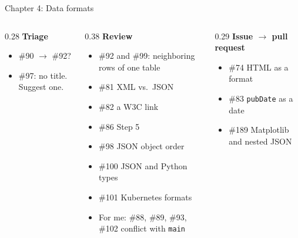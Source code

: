 \documentclass[9pt,aspectratio=169]{beamer}
\begin{document}
\begin{frame}{Chapter 4: Data formats}
    \begin{columns}[T]
        \begin{column}{0.28\textwidth}
            \textbf{Triage}
            \begin{itemize}\small
                \item \#90 $\to$ \#92?
                \item \#97: no title. Suggest one.
            \end{itemize}
        \end{column}
        \begin{column}{0.38\textwidth}
            \textbf{Review}
            \begin{itemize}\small
                \item \#92 and \#99: neighboring rows of one table
                \item \#81 XML vs.\ JSON
                \item \#82 a W3C link
                \item \#86 Step 5
                \item \#98 JSON object order
                \item \#100 JSON and Python types
                \item \#101 Kubernetes formats
                \item For me: \#88, \#89, \#93, \#102 conflict with \texttt{main}
            \end{itemize}
        \end{column}
        \begin{column}{0.29\textwidth}
            \textbf{Issue $\to$ pull request}
            \begin{itemize}\small
                \item \#74 HTML as a format
                \item \#83 \texttt{pubDate} as a date
                \item \#189 Matplotlib and nested JSON
            \end{itemize}
        \end{column}
    \end{columns}
\end{frame}
\end{document}
